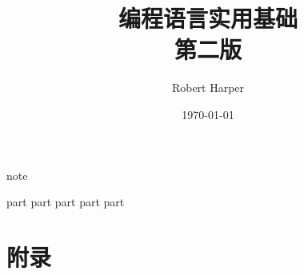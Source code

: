 \documentclass{ctexbook}
\title{{\Huge\textbf{编程语言实用基础}} \\第二版}
\author{Robert Harper}
\date{\today}
\begin{document}
\frontmatter
\maketitle

{note}

\setcounter{tocdepth}{1}
\tableofcontents

\newpage
\mainmatter

{part}
{part}
 {part}
 {part}
{part}

\backmatter
\part{附录}
\appendix
\printglossary[title=术语]
\end{document}
